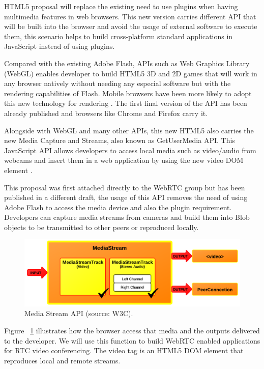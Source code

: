 HTML5 proposal will replace the existing need to use plugins when having multimedia features in web browsers. This new version carries different API that will be built into the browser and avoid the usage of external software to execute them, this scenario helps to build cross-platform standard applications in JavaScript instead of using plugins. 

Compared with the existing Adobe Flash, APIs such as Web Graphics Library (WebGL) enables developer to build HTML5 3D and 2D games that will work in any browser natively without needing any especial software but with the rendering capabilities of Flash. Mobile browsers have been more likely to adopt this new technology for rendering \cite{webglDraft}. The first final version of the API has been already published and browsers like Chrome and Firefox carry it.

Alongside with WebGL and many other APIs, this new HTML5 also carries the new Media Capture and Streams, also known as GetUserMedia API. This JavaScript API allows developers to access local media such as video/audio from webcams and insert them in a web application by using the new video DOM element \cite{getusermediaDraft}.

This proposal was first attached directly to the WebRTC group but has been published in a different draft, the usage of this API removes the need of using Adobe Flash to access the media device and also the plugin requirement. Developers can capture media streams from cameras and build them into Blob objects to be transmitted to other peers or reproduced locally.

 \begin{figure}[h]
  \centering
    \includegraphics[scale=1]{./figures/mediastreamAPI.png}
      \caption[Media Stream API (source: W3C)]{Media Stream API (source: W3C).}
	\label{fig:mediastreamAPI}
\end{figure}

Figure ~\ref{fig:mediastreamAPI} illustrates how the browser access that media and the outputs delivered to the developer. We will use this function to build WebRTC enabled applications for RTC video conferencing. The video tag is an HTML5 DOM element that reproduces local and remote streams.

